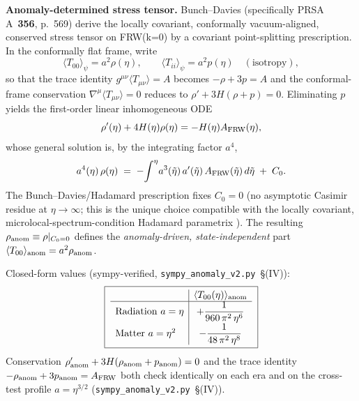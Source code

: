 \documentclass[11pt]{article}
\begin{document}
\medskip
\noindent\textbf{Anomaly-determined stress tensor.}  Bunch--Davies
\cite{BunchDavies1977} (specifically PRSA A~\textbf{356}, p.~569) derive
the locally covariant, conformally vacuum-aligned, conserved stress
tensor on FRW(k=0) by a covariant point-splitting prescription.  In
the conformally flat frame, write
\[
   \langle T_{00}\rangle_\psi=a^2\rho(\eta),\qquad
   \langle T_{ii}\rangle_\psi=a^2 p(\eta)\quad(\text{isotropy}),
\]
so that the trace identity $g^{\mu\nu}\langle T_{\mu\nu}\rangle=A$
becomes $-\rho+3p=A$ and the conformal-frame conservation
$\nabla^\mu\langle T_{\mu\nu}\rangle=0$ reduces to
$\rho'+3H(\rho+p)=0$.  Eliminating $p$ yields the first-order linear
inhomogeneous ODE
\begin{equation}
   \rho'(\eta)+4H(\eta)\rho(\eta)=-H(\eta)A_{\rm FRW}(\eta),
   \label{eq:rho-ODE}
\end{equation}
whose general solution is, by the integrating factor $a^4$,
\begin{equation}
   a^4(\eta)\,\rho(\eta)
   \;=\;-\!\int^{\eta}\!a^3(\tilde\eta)\,a'(\tilde\eta)\,A_{\rm FRW}(\tilde\eta)\,
        d\tilde\eta
   \;+\;C_0.
   \label{eq:rho-int-factor}
\end{equation}
The Bunch--Davies/Hadamard prescription fixes $C_0=0$ (no asymptotic
Casimir residue at $\eta\to\infty$; this is the unique choice
compatible with the locally covariant, microlocal-spectrum-condition
Hadamard parametrix \cite{HollandsWald2001}).  The resulting
$\rho_{\rm anom}\equiv\rho|_{C_0=0}$ defines the \emph{anomaly-driven,
state-independent} part $\langle T_{00}\rangle_{\rm anom}=
a^2\rho_{\rm anom}$.

\smallskip
Closed-form values (sympy-verified, \texttt{sympy\_anomaly\_v2.py}~\S(IV)):
\begin{equation}
\boxed{\;
\begin{array}{l|c}
  & \langle T_{00}(\eta)\rangle_{\rm anom}\\\hline
  \text{Radiation }a=\eta
  & +\dfrac{1}{960\,\pi^2\,\eta^{6}}\\[6pt]
  \text{Matter }a=\eta^{2}
  & -\dfrac{1}{48\,\pi^2\,\eta^{8}}
\end{array}\;}
\label{eq:T00-anom-eras}
\end{equation}
Conservation $\rho_{\rm anom}'+3H(\rho_{\rm anom}+p_{\rm anom})=0$
and the trace identity $-\rho_{\rm anom}+3p_{\rm anom}=A_{\rm FRW}$
both check identically on each era and on the cross-test profile
$a=\eta^{3/2}$ (\texttt{sympy\_anomaly\_v2.py}~\S(IV)).
\end{document}

